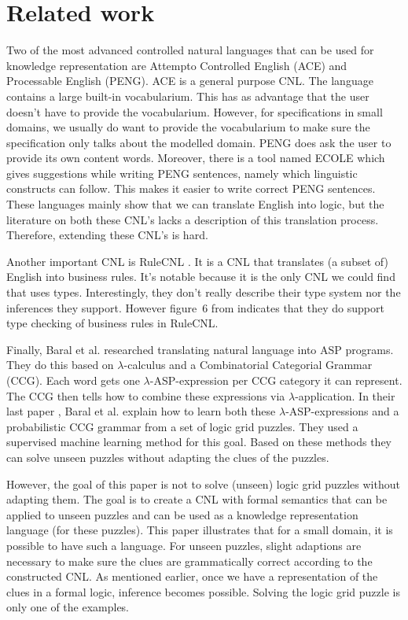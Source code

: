 \section{Related work}

Two of the most advanced controlled natural languages that can be used for knowledge representation are Attempto Controlled English (ACE) and Processable English (PENG). ACE \cite{Fuchs2008} is a general purpose CNL. The language contains a large built-in vocabularium. This has as advantage that the user doesn't have to provide the vocabularium. However, for specifications in small domains, we usually do want to provide the vocabularium to make sure the specification only talks about the modelled domain. PENG \cite{Schwitter2002} does ask the user to provide its own content words. Moreover, there is a tool named ECOLE which gives suggestions while writing PENG sentences, namely which linguistic constructs can follow. This makes it easier to write correct PENG sentences. These languages mainly show that we can translate English into logic, but the literature on both these CNL's lacks a description of this translation process. Therefore, extending these CNL's is hard.

Another important CNL is RuleCNL \cite{Njonko2014}. It is a CNL that translates (a subset of) English into business rules. It's notable because it is the only CNL we could find that uses types. Interestingly, they don't really describe their type system nor the inferences they support. However figure~6 from \cite{Njonko2014} indicates that they do support type checking of business rules in RuleCNL.

Finally, Baral et al. \cite{Baral2008, Costantini2010, Baral2012, Baral2012a} researched translating natural language into ASP programs. They do this based on $\lambda$-calculus and a Combinatorial Categorial Grammar (CCG). Each word gets one $\lambda$-ASP-expression per CCG category it can represent. The CCG then tells how to combine these expressions via $\lambda$-application. In their last paper \cite{Baral2012a}, Baral et al. explain how to learn both these $\lambda$-ASP-expressions and a probabilistic CCG grammar from a set of logic grid puzzles. They used a supervised machine learning method for this goal. Based on these methods they can solve unseen puzzles without adapting the clues of the puzzles.

However, the goal of this paper is not to solve (unseen) logic grid puzzles without adapting them. The goal is to create a CNL with formal semantics that can be applied to unseen puzzles and can be used as a knowledge representation language (for these puzzles). This paper illustrates that for a small domain, it is possible to have such a language. For unseen puzzles, slight adaptions are necessary to make sure the clues are grammatically correct according to the constructed CNL. As mentioned earlier, once we have a representation of the clues in a formal logic, inference becomes possible. Solving the logic grid puzzle is only one of the examples.
